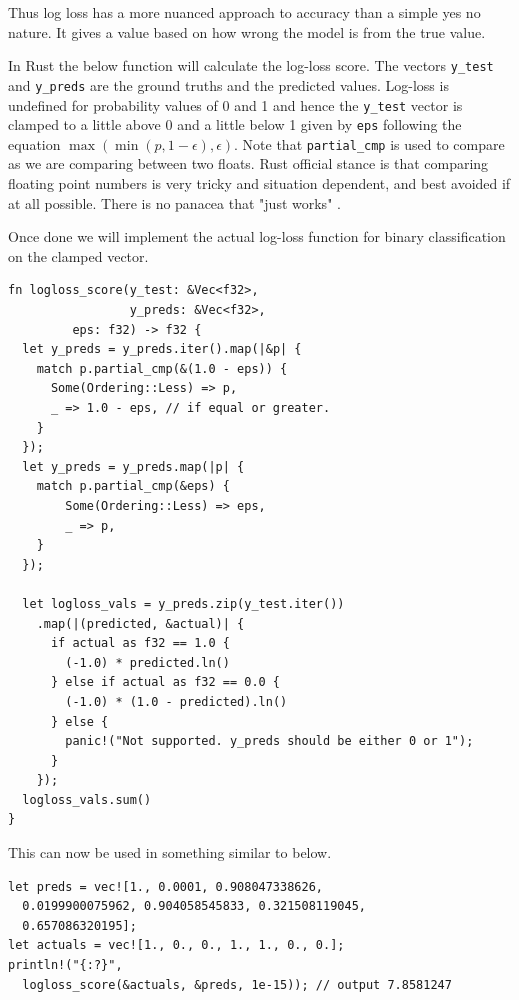 \documentclass{book}
\begin{document}
Thus log loss has a more nuanced approach to accuracy than a simple yes no nature. It gives a value based on how wrong the model is from the true value.

In Rust the below function will calculate the log-loss score. The vectors \lstinline{y_test} and \lstinline{y_preds} are the ground truths and the predicted values. Log-loss is undefined for probability values of 0 and 1 and hence the \lstinline{y_test} vector is clamped to a little above 0 and a little below 1 given by \lstinline{eps} following the equation $\max(\min(p, 1 - \epsilon), \epsilon)$. Note that \lstinline{partial_cmp} is used to compare as we are comparing between two floats. Rust official stance is that comparing floating point numbers is very tricky and situation dependent, and best avoided if at all possible. There is no panacea that "just works"\cite{WEBSITE:19} .

Once done we will implement the actual log-loss function for binary classification on the clamped vector.

\begin{lstlisting}[caption={ml\\-utils\\/src\\/sup\_metrics\\.rs}]
fn logloss_score(y_test: &Vec<f32>,
                 y_preds: &Vec<f32>,
		 eps: f32) -> f32 {
  let y_preds = y_preds.iter().map(|&p| {
    match p.partial_cmp(&(1.0 - eps)) {
      Some(Ordering::Less) => p,
      _ => 1.0 - eps, // if equal or greater.
    }
  });
  let y_preds = y_preds.map(|p| {
    match p.partial_cmp(&eps) {
        Some(Ordering::Less) => eps,
        _ => p,
    }
  });

  let logloss_vals = y_preds.zip(y_test.iter())
    .map(|(predicted, &actual)| {
      if actual as f32 == 1.0 {
        (-1.0) * predicted.ln()
      } else if actual as f32 == 0.0 {
        (-1.0) * (1.0 - predicted).ln()
      } else {
        panic!("Not supported. y_preds should be either 0 or 1");
      }
    });
  logloss_vals.sum()
}
\end{lstlisting}

This can now be used in something similar to below.

\begin{lstlisting}[caption={}]
let preds = vec![1., 0.0001, 0.908047338626,
  0.0199900075962, 0.904058545833, 0.321508119045,
  0.657086320195];
let actuals = vec![1., 0., 0., 1., 1., 0., 0.];
println!("{:?}",
  logloss_score(&actuals, &preds, 1e-15)); // output 7.8581247
\end{lstlisting}
\label{par:logarithmic_loss}
\end{document}
